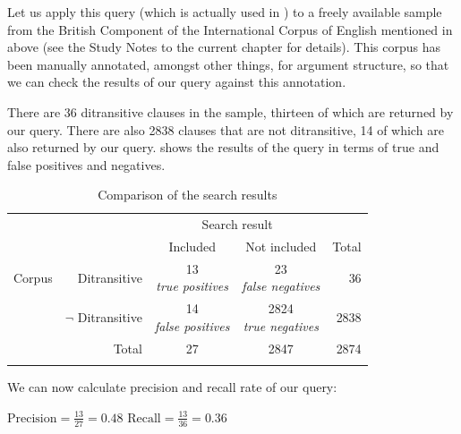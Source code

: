 Let us apply this query  (which is actually used in \citealt{colleman_constructional_2011}) to a freely available sample from the British Component of the International Corpus of English mentioned in  above (see the Study Notes to the current chapter for details). This corpus has been manually annotated,  amongst other things, for argument structure, so that we can check the results of our query  against this  annotation.

There are 36 ditransitive  clauses in the sample, thirteen of which are returned by our query.  There are also 2838 clauses that are not ditransitive, 14 of which are also returned by our query.  shows the results of the query in terms of true and false positives and negatives.

\begin{table}[H]
\caption{Comparison of the search results}
\label{tab:queryoutcomesexample}
\begin{tabular}[t]{lrccr}
\lsptoprule
 & & \multicolumn{2}{c}{Search result} & \\
 & & Included & Not included & Total \\
\midrule
Corpus & Ditransitive & \makecell[t]{13 \\ \footnotesize{\textit{true positives}}} & \makecell[t]{23 \\ \footnotesize{\textit{false negatives}}} & 36 \\
 & $\lnot$ Ditransitive & \makecell[t]{14 \\ \footnotesize{\textit{false positives}}} & \makecell[t]{2824 \\ \footnotesize{\textit{true negatives}}} & 2838 \\
\midrule
 & Total & 27 & 2847 & 2874 \\
\lspbottomrule
\end{tabular}
\end{table}

We can now calculate precision  and recall  rate of our  query:

\begin{exe}
\ex
\begin{xlist}
\label{ex:precisionrecallrate}
\ex $\displaystyle{\text{Precision} = \frac{13}{27} = 0.48}$
\ex $\displaystyle{\text{Recall} = \frac{13}{36} = 0.36}$
\end{xlist}
\end{exe}

